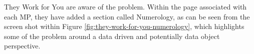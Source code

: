 They Work for You are aware of the problem. Within the page associated with each MP, they have added a section called Numerology, 
as can be seen from the screen shot within Figure \ref{fig:they-work-for-you-numerology},
which highlights some of the problem around a data driven and potentially data object perspective.